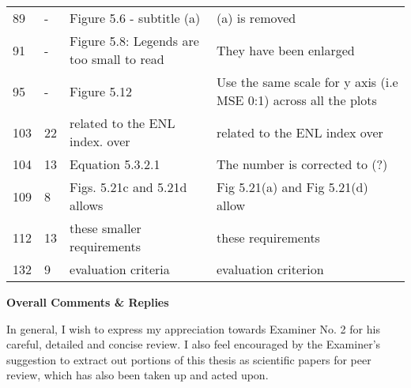 \begin{longtable}[c]{p{}|p{}|p{}|p{}}
89 & - & Figure 5.6 - subtitle (a) & (a) is removed \\
91 & - & Figure 5.8: Legends are too small to read & They have been enlarged \\
95 & - & Figure 5.12 & Use the same scale for  y axis (i.e MSE 0:1) across all the plots \\
103 & 22 & related to the ENL index. over & related to the ENL index over \\
104 & 13 & Equation 5.3.2.1 & The number is corrected to (?) \\  %
109 & 8 & Figs. 5.21c and 5.21d allows & Fig 5.21(a) and Fig 5.21(d) allow \\
112 & 13 & these smaller requirements & these requirements \\
132 & 9 & evaluation criteria & evaluation criterion
\end{longtable}    

\textbf{Overall Comments \& Replies}

In general, I wish to express my appreciation towards Examiner No. 2 for his careful, detailed and concise review.
I also feel encouraged by the Examiner's suggestion to extract out portions of this thesis as scientific papers for peer review, which has also been taken up and acted upon.

